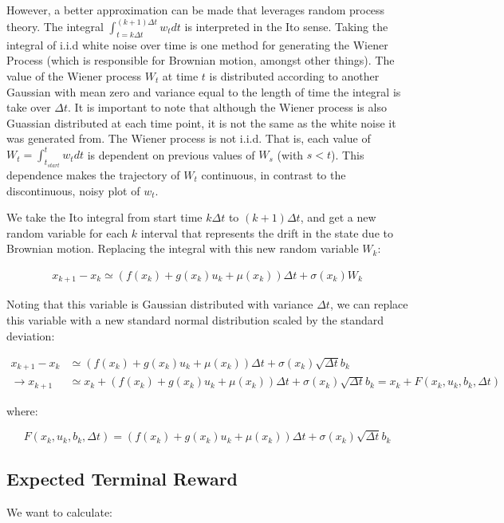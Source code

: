 \documentclass[a4paper]{article}
\begin{document}
However, a better approximation can be made that leverages random process theory.
The integral $\int_{t = k \Delta t}^{(k+1) \Delta t} w_t dt$ is interpreted in the Ito sense.
Taking the integral of i.i.d white noise over time is one method for generating the Wiener Process (which is responsible for Brownian motion, amongst other things).
The value of the Wiener process $W_t$ at time $t$ is distributed according to another Gaussian with mean zero and variance equal to the length of time the integral is take over $\Delta t$.
It is important to note that although the Wiener process is also Guassian distributed at each time point, it is not the same as the white noise it was generated from.
The Wiener process is not i.i.d.
That is, each value of $W_t = \int_{t_{start}}^{t} w_t dt$ is dependent on previous values of $W_s$ (with $s<t$).
This dependence makes the trajectory of $W_t$ continuous, in contrast to the discontinuous, noisy plot of $w_t$.

We take the Ito integral from start time $k \Delta t$ to $(k+1) \Delta t$, and get a new random variable for each $k$ interval that represents the drift in the state due to Brownian motion.
Replacing the integral with this new random variable $W_k$:

\begin{align}
x_{k+1} - x_k \simeq (f(x_k) + g(x_k) u_k + \mu(x_k)) \Delta t + \sigma(x_k) W_k
\end{align}

Noting that this variable is Gaussian distributed with variance $\Delta t$, we can replace this variable with a new standard normal distribution scaled by the standard deviation:

\begin{align}
x_{k+1} - x_k &\simeq (f(x_k) + g(x_k) u_k + \mu(x_k)) \Delta t + \sigma(x_k) \sqrt{\Delta t} b_k
\\ \rightarrow x_{k+1} &\simeq x_k + (f(x_k) + g(x_k) u_k + \mu(x_k)) \Delta t + \sigma(x_k) \sqrt{\Delta t} b_k = x_k + F(x_k,u_k,b_k,\Delta t)
\label{eq:DistochDyn}
\end{align}

where:

$$
F(x_k,u_k,b_k,\Delta t) = (f(x_k) + g(x_k) u_k + \mu(x_k)) \Delta t + \sigma(x_k) \sqrt{\Delta t} b_k
$$

\subsection{Expected Terminal Reward}
We want to calculate:
\end{document}
